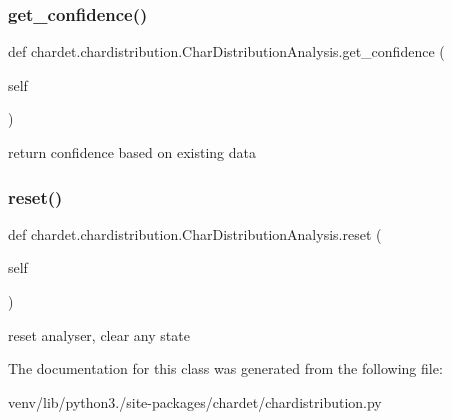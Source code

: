 \subsubsection{\texorpdfstring{get\+\_\+confidence()}{get\_confidence()}}
{\footnotesize\ttfamily def chardet.\+chardistribution.\+Char\+Distribution\+Analysis.\+get\+\_\+confidence (\begin{DoxyParamCaption}\item[{}]{self }\end{DoxyParamCaption})}

\begin{DoxyVerb}return confidence based on existing data\end{DoxyVerb}
 \mbox{\label{classchardet_1_1chardistribution_1_1_char_distribution_analysis_a6f355660d4bc601766471b20d79dcee9}} 
\subsubsection{\texorpdfstring{reset()}{reset()}}
{\footnotesize\ttfamily def chardet.\+chardistribution.\+Char\+Distribution\+Analysis.\+reset (\begin{DoxyParamCaption}\item[{}]{self }\end{DoxyParamCaption})}

\begin{DoxyVerb}reset analyser, clear any state\end{DoxyVerb}
 

The documentation for this class was generated from the following file\+:\begin{DoxyCompactItemize}
\item 
venv/lib/python3./site-\/packages/chardet/chardistribution.\+py\end{DoxyCompactItemize}
